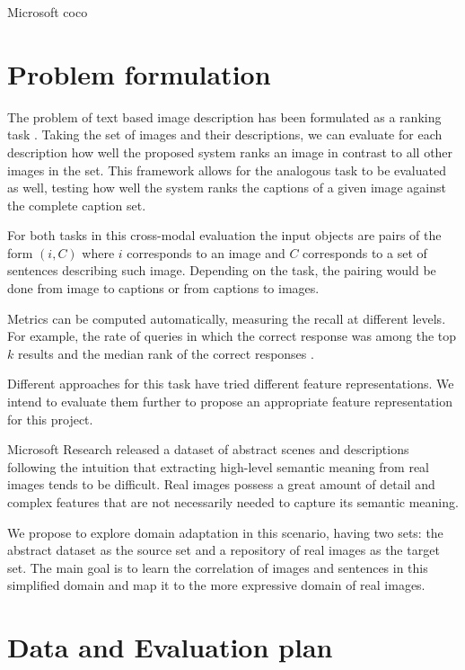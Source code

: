 \documentclass[11pt]{article}
\begin{document}
Microsoft coco



\section{Problem formulation}

The problem of text based image description has been formulated as a ranking task \cite{Hodosh:2013:FID:2566972.2566993}. Taking the set of images and their descriptions, we can evaluate for each description how well the proposed system ranks an image in contrast to all other images in the set. This framework allows for the analogous task to be evaluated as well, testing how well the system ranks the captions of a given image against the complete caption set. 

For both tasks in this cross-modal evaluation the input objects are pairs of the form $(i, C)$ where $i$ corresponds to an image and $C$ corresponds to a set of sentences describing such image. Depending on the task, the pairing would be done from image to captions or from captions to images. 

Metrics can be computed automatically, measuring the recall at different levels. For example, the rate of queries in which the correct response was among the top $k$ results and the median rank of the correct responses \cite{Hodosh:2013:FID:2566972.2566993}. 

Different approaches for this task have tried different feature representations. We intend to evaluate them further to propose an appropriate feature representation for this project.

Microsoft Research released a dataset of abstract scenes and descriptions following the intuition that
extracting high-level semantic meaning from real images tends to be difficult. Real images possess a great amount of detail and complex features that are not necessarily needed to capture its semantic meaning. 

We propose to explore domain adaptation in this scenario, having two sets: the abstract dataset as the source set and a repository of real images as the target set. The main goal is to learn the correlation of images and sentences in this simplified domain and map it to the more expressive domain of real images. 


\section{Data and Evaluation plan}
\end{document}
